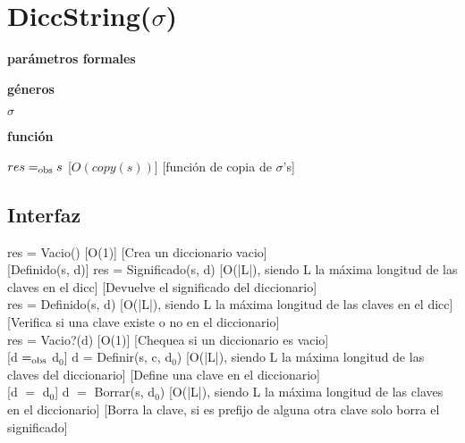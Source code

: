 \section{DiccString($\sigma$)}

\textbf{parámetros formales}\parindent\\
\parbox{1.7cm}{\textbf{géneros}}  $\sigma$\\
\parbox[t]{1.7cm}{\textbf{función}}\parbox[t]{\textwidth-2\parindent-1.7cm}{%
{$res =_{\mathrm{obs}} s$}
[$O(copy(s))$]
[función de copia de $\sigma$'s]
}

\subsection{Interfaz}

{res = Vacio()}
[O(1)]
[Crea un diccionario vacio]\\

[Definido(s, d)]
{res = Significado(s, d)}
[O(|L|), siendo L la máxima longitud de las claves en el dicc]
[Devuelve el significado del diccionario]\\

{res = Definido(s, d)}
[O(|L|), siendo L la máxima longitud de las claves en el dicc]
[Verifica si una clave existe o no en el diccionario]\\

{res = Vacio?(d)}
[O(1)]
[Chequea si un diccionario es vacio]\\

[d $=_{\mathrm{obs}}$ d$_0$]
{d = Definir(s, c, d$_0$)}
[O(|L|), siendo L la máxima longitud de las claves del diccionario]
[Define una clave en el diccionario]\\

[d $=$ d$_0$]
{d $=$ Borrar(s, d$_0$)}
[O(|L|), siendo L la máxima longitud de las claves en el diccionario]
[Borra la clave, si es prefijo de alguna otra clave solo borra el significado]

